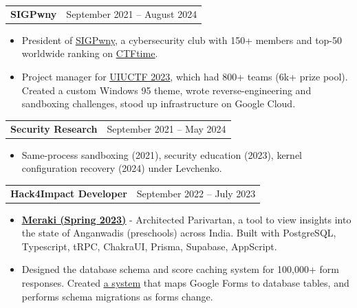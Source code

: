 \documentclass[letterpaper,11pt]{article}
\makeatletter
\newcommand{\uhref}[2]{\href{#1}{\uline{#2}}}
\newcommand{\resumeItem}[1]{
	\item\small{
		{#1 \vspace{-2pt}}
	}
}
\newcommand{\resumeProjectHeading}[2]{
	\item
	\begin{tabular*}{0.97\textwidth}{l@{\extracolsep{\fill}}r}
		\small#1 & #2 \\
	\end{tabular*}\vspace{-7pt}
}
\newcommand{\resumeItemListStart}{\begin{itemize}}
\newcommand{\resumeItemListEnd}{\end{itemize}\vspace{-5pt}}
\makeatother
\begin{document}
	\resumeProjectHeading{\textbf{SIGPwny}}{September 2021 -- August 2024}
	\resumeItemListStart
	\resumeItem{President of \uhref{https://sigpwny.com}{SIGPwny}, a cybersecurity club with 150+ members and top-50 worldwide ranking on \uhref{https://ctftime.org/team/27763}{CTFtime}.
        }
        \resumeItem{
Project manager for \uhref{https://2023.uiuc.tf}{UIUCTF 2023}, which had 800+ teams (6k+ prize pool). Created a custom Windows 95 theme, wrote reverse-engineering and sandboxing challenges, stood up infrastructure on Google Cloud.
        }
	\resumeItemListEnd
        \resumeProjectHeading{\textbf{Security Research}}{September 2021 -- May 2024}
        \resumeItemListStart
                \resumeItem{Same-process sandboxing (2021), security education (2023), kernel configuration recovery (2024) under Levchenko.}
        \resumeItemListEnd
	\resumeProjectHeading{\textbf{Hack4Impact Developer}}{September 2022 -- July 2023}
	\resumeItemListStart
        \resumeItem{
            \textbf{\uhref{https://uiuc.hack4impact.org/projects/meraki}{Meraki (Spring 2023)}} - Architected Parivartan, a tool to view insights into the state of Anganwadis (preschools) across India. Built with PostgreSQL, Typescript, tRPC, ChakraUI, Prisma, Supabase, AppScript.
        }
        \resumeItem{Designed the database schema and score caching system for 100,000+ form responses. Created \uhref{https://stenger.io/blog/abusing-google-forms/}{a system} that maps Google Forms to database tables, and performs schema migrations as forms change.}
        \resumeItemListEnd
\end{document}
